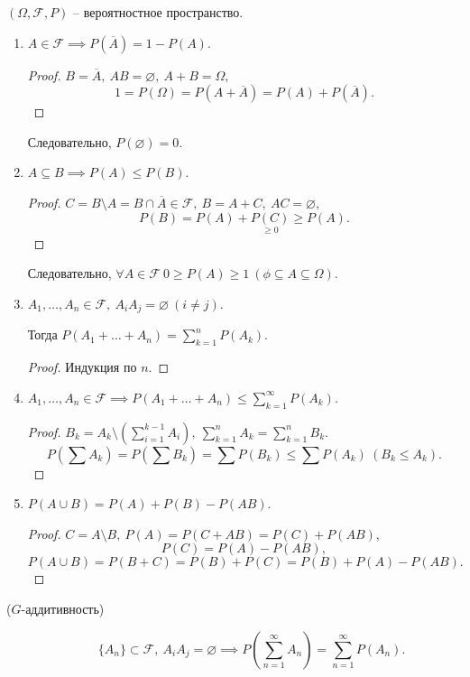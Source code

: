 \begin{theorem}
    $(\Omega,\mathcal{F},P)$ -- вероятностное пространство.
    \begin{enumerate}
        \item $A \in \mathcal{F}\implies P(\overline{A}) = 1 - P(A)$.
        \begin{proof}
            $B = \overline{A}, \ AB = \varnothing, \ A+B = \Omega,$
            \[
                1 = P(\Omega) = P(A+\overline{A}) = P(A) + P(\overline{A}).
            \]
        \end{proof}

        Следовательно, $P(\varnothing) = 0$.

        \item $A \subseteq B \implies P(A) \leqslant P(B)$.
        \begin{proof}
            $C = B \setminus A = B \cap \overline{A} \in \mathcal{F}, \ B = A + C, \ AC = \varnothing$,
            \[
                P(B) = P(A) + \underset{\geqslant 0}{P(C)} \geqslant P(A).
            \]
        \end{proof}

        Следовательно, $\forall A \in \mathcal{F} \ 0 \geqslant P(A) \geqslant 1 \ (\phi \subseteq A \subseteq \Omega)$.

        \item $A_1,\ldots,A_n \in \mathcal{F}, \ A_iA_j = \varnothing \ (i\ne j)$.

        Тогда $P(A_1 + \ldots + A_n) = \sum_{k=1}^{n}P(A_k)$.
        \begin{proof}
          Индукция по $n$.
        \end{proof}

        \item $A_1,\ldots,A_n \in \mathcal{F}\implies P(A_1 + \ldots + A_n) \leqslant \sum_{k=1}^{\infty}P(A_k)$.
        \begin{proof}
            $B_k = A_k \setminus \left(\sum_{i=1}^{k-1}A_i\right), \ \sum_{k=1}^{n}A_k = \sum_{k=1}^{n}B_k$.
            \[
                P \left(\sum A_k\right) = P(\sum B_k) = \sum P(B_k) \leqslant \sum P(A_k) \ (B_k \leqslant A_k).
            \]
        \end{proof}

        \item $P(A \cup B) = P(A) + P(B) - P(AB)$.
        \begin{proof}
            $C = A \setminus B, \ P(A) = P(C + AB) = P(C) + P(AB)$,
            \[
                P(C) = P(A) - P(AB),
            \]
            \[
                P(A \cup B) = P(B + C) = P(B) + P(C) = P(B) + P(A) - P(AB).
            \]
        \end{proof}
    \end{enumerate}
    \begin{description}
        \item[ ($G$-аддитивность)]
        \[
            \{A_n\}\subset \mathcal{F}, \ A_iA_j = \varnothing \implies P \left(\sum_{n=1}^{\infty}A_n\right) = \sum_{n=1}^{\infty }P(A_n).
        \]
    \end{description}
\end{theorem}

